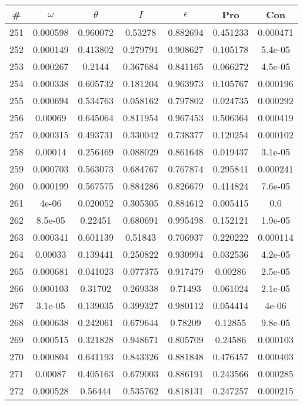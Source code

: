 \newpage
\begin{table}
\begin{tabular}{c|c|c|c|c|c|c}
\# & $\omega$ & $\theta$ & $I$ & $\epsilon$ & Pro & Con\\
\hline
251 & 0.000598 & 0.960072 & 0.53278 & 0.882694 & 0.451233 & 0.000471\\
252 & 0.000149 & 0.413802 & 0.279791 & 0.908627 & 0.105178 & 5.4e-05\\
253 & 0.000267 & 0.2144 & 0.367684 & 0.841165 & 0.066272 & 4.5e-05\\
254 & 0.000338 & 0.605732 & 0.181204 & 0.963973 & 0.105767 & 0.000196\\
255 & 0.000694 & 0.534763 & 0.058162 & 0.797802 & 0.024735 & 0.000292\\
256 & 0.00069 & 0.645064 & 0.811954 & 0.967453 & 0.506364 & 0.000419\\
257 & 0.000315 & 0.493731 & 0.330042 & 0.738377 & 0.120254 & 0.000102\\
258 & 0.00014 & 0.256469 & 0.088029 & 0.861648 & 0.019437 & 3.1e-05\\
259 & 0.000703 & 0.563073 & 0.684767 & 0.767874 & 0.295841 & 0.000241\\
260 & 0.000199 & 0.567575 & 0.884286 & 0.826679 & 0.414824 & 7.6e-05\\
261 & 4e-06 & 0.020052 & 0.305305 & 0.884612 & 0.005415 & 0.0\\
262 & 8.5e-05 & 0.22451 & 0.680691 & 0.995498 & 0.152121 & 1.9e-05\\
263 & 0.000341 & 0.601139 & 0.51843 & 0.706937 & 0.220222 & 0.000114\\
264 & 0.00033 & 0.139441 & 0.250822 & 0.930994 & 0.032536 & 4.2e-05\\
265 & 0.000681 & 0.041023 & 0.077375 & 0.917479 & 0.00286 & 2.5e-05\\
266 & 0.000103 & 0.31702 & 0.269338 & 0.71493 & 0.061024 & 2.1e-05\\
267 & 3.1e-05 & 0.139035 & 0.399327 & 0.980112 & 0.054414 & 4e-06\\
268 & 0.000638 & 0.242061 & 0.679644 & 0.78209 & 0.12855 & 9.8e-05\\
269 & 0.000515 & 0.321828 & 0.948671 & 0.805709 & 0.24586 & 0.000103\\
270 & 0.000804 & 0.641193 & 0.843326 & 0.881848 & 0.476457 & 0.000403\\
271 & 0.00087 & 0.405163 & 0.679003 & 0.886191 & 0.243566 & 0.000285\\
272 & 0.000528 & 0.56444 & 0.535762 & 0.818131 & 0.247257 & 0.000215\\

\end{tabular}
\end{table}
